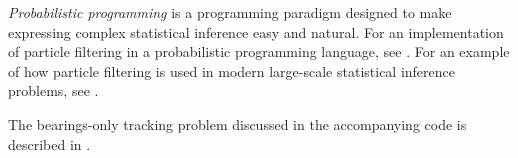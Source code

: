 \documentclass{article}
\numberwithin{equation}{section}
\begin{document}
\textit{Probabilistic programming} is a programming paradigm designed to make expressing complex statistical inference
easy and natural. For an implementation of particle filtering in a probabilistic programming language, see \cite{gen}.
For an example of how particle filtering is used in modern large-scale statistical inference problems, see \cite{berke}. 

The bearings-only tracking problem discussed in the accompanying code is described in \cite{gilks}. 




        
\end{document}
